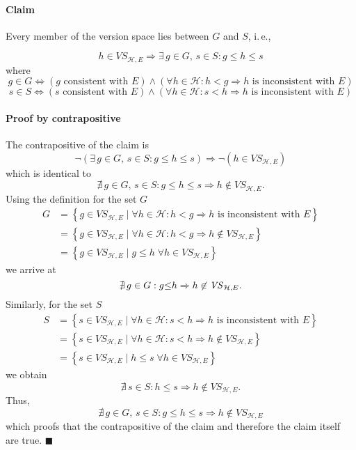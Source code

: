 \paragraph*{Claim}

Every member of the version space lies between $G$ and $S$, i.$\,$e.,

\[
h\in\mathit{VS}_{\mathcal{H},E}\Rightarrow\exists\, g\in G,\, s\in S:g\leq h\leq s
\]
where
\[
g\in G\Leftrightarrow\left(g\text{ consistent with }E\right)\land\left(\forall h\in\mathcal{H}:h<g\Rightarrow h\text{ is inconsistent with }E\right)
\]
\[
s\in S\Leftrightarrow\left(s\text{ consistent with }E\right)\land\left(\forall h\in\mathcal{H}:s<h\Rightarrow h\text{ is inconsistent with }E\right)
\]



\paragraph*{Proof by contrapositive}

The contrapositive of the claim is
\[
\lnot\left(\exists\, g\in G,\, s\in S:g\leq h\leq s\right)\Rightarrow\lnot\left(h\in\mathit{VS}_{\mathcal{H},E}\right)
\]
which is identical to 
\[
\nexists\, g\in G,\, s\in S:g\leq h\leq s\Rightarrow h\not\in\mathit{VS}_{\mathcal{H},E}.
\]
Using the definition for the set $G$
\[
\begin{aligned}G & =\left\{ g\in\mathit{VS}_{\mathcal{H},E}\mid\forall h\in\mathcal{H}:h<g\Rightarrow h\text{ is inconsistent with }E\right\} \\
 & =\left\{ g\in\mathit{VS}_{\mathcal{H},E}\mid\forall h\in\mathcal{H}:h<g\Rightarrow h\not\in\mathit{VS}_{\mathcal{H},E}\right\} \\
 & =\left\{ g\in\mathit{VS}_{\mathcal{H},E}\mid g\leq h\;\forall h\in\mathit{VS}_{\mathcal{H},E}\right\} 
\end{aligned}
\]
we arrive at 
\[
\nexists\, g\in G:g\text{\ensuremath{\leq}}h\Rightarrow h\not\in\mathit{VS}_{\mathcal{H},E}.
\]
Similarly, for the set $S$
\[
\begin{aligned}S & =\left\{ s\in\mathit{VS}_{\mathcal{H},E}\mid\forall h\in\mathcal{H}:s<h\Rightarrow h\text{ is inconsistent with }E\right\} \\
 & =\left\{ s\in\mathit{VS}_{\mathcal{H},E}\mid\forall h\in\mathcal{H}:s<h\Rightarrow h\not\in\mathit{VS}_{\mathcal{H},E}\right\} \\
 & =\left\{ s\in\mathit{VS}_{\mathcal{H},E}\mid h\leq s\;\forall h\in\mathit{VS}_{\mathcal{H},E}\right\} 
\end{aligned}
\]
we obtain
\[
\nexists\, s\in S:h\leq s\Rightarrow h\not\in\mathit{VS}_{\mathcal{H},E}.
\]
Thus, 
\[
\nexists\, g\in G,\, s\in S:g\leq h\leq s\Rightarrow h\not\in\mathit{VS}_{\mathcal{H},E}
\]
 which proofs that the contrapositive of the claim and therefore the
claim itself are true. \newline \phantom{x}\hfill $\blacksquare$

